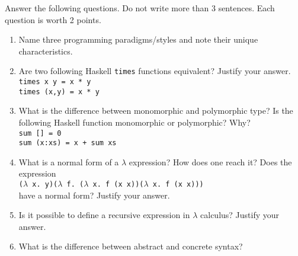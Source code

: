 Answer the following questions. Do not write more than 3 sentences. Each question is worth 2 points.
\begin{enumerate}
\item Name three programming paradigms/styles and note their unique characteristics.
\vspace{5cm}



\item Are two following Haskell \texttt{times} functions equivalent? Justify your answer.\\
\texttt{times x y = x * y}\\
\texttt{times (x,y) = x * y}
\vspace{5cm}

\item
What is the difference between monomorphic and polymorphic type? Is the following Haskell function monomorphic or polymorphic? Why?\\
\texttt{sum [] = 0}\\
\texttt{sum (x:xs) = x + sum xs} 
\vspace{5cm}

\newpage
\item What is a normal form of a $\lambda$ expression? How does one reach it? Does the expression\\
\texttt{($\lambda$ x. y)($\lambda$ f. ($\lambda$ x. f (x x))($\lambda$ x. f (x x)))}\\
have a normal form? Justify your answer.
\vspace{6cm}

\item Is it possible to define a recursive expression in $\lambda$ calculus? Justify your answer.
\vspace{6cm}

\item What is the difference between abstract and concrete syntax?
\vspace{6cm}


\end{enumerate}
